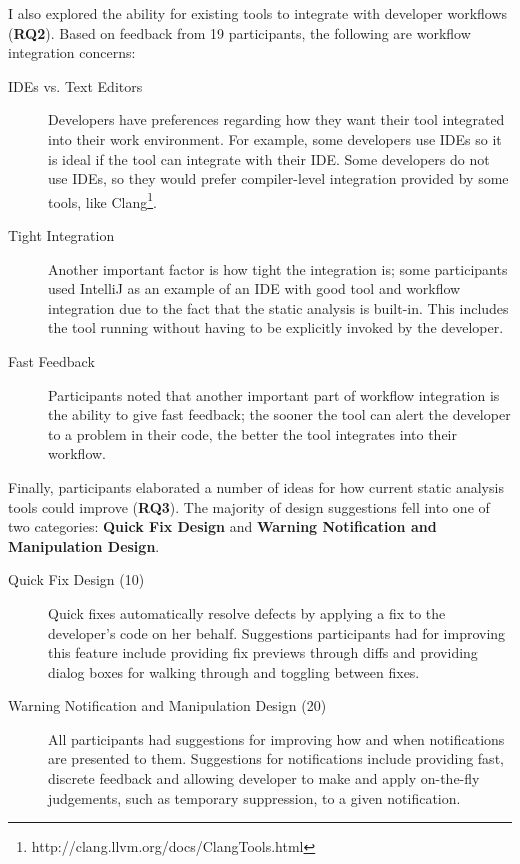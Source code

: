 \documentclass{llncs}
\begin{document}
I also explored the ability for existing tools to integrate with developer workflows (\textbf{RQ2}). Based on feedback from 19 participants, the following are workflow integration concerns:
\begin{description}
	\item[IDEs vs. Text Editors] Developers have preferences regarding how they want their tool integrated into their work environment. For example, some developers use IDEs so it is ideal if the tool can integrate with their IDE. Some developers do not use IDEs, so they would prefer compiler-level integration provided by some tools, like Clang\footnote{http://clang.llvm.org/docs/ClangTools.html}.
	\item[Tight Integration] Another important factor is how tight the integration is; some participants used IntelliJ as an example of an IDE with good tool and workflow integration due to the fact that the static analysis is built-in. This includes the tool running without having to be explicitly invoked by the developer.
	\item [Fast Feedback] Participants noted that another important part of workflow integration is the ability to give fast feedback; the sooner the tool can alert the developer to a problem in their code, the better the tool integrates into their workflow.
\end{description}

Finally, participants elaborated a number of ideas for how current static analysis tools could improve (\textbf{RQ3}). 
The majority of design suggestions fell into one of two categories: \textbf{Quick Fix Design} and \textbf{Warning Notification and Manipulation Design}.
\begin{description}
	\item[Quick Fix Design (10)] Quick fixes automatically resolve defects by applying a fix to the developer's code on her behalf. Suggestions participants had for improving this feature include providing fix previews through diffs and providing dialog boxes for walking through and toggling between fixes. 
	\item [Warning Notification and Manipulation Design (20)] All participants had suggestions for improving how and when notifications are presented to them. Suggestions for notifications include providing fast, discrete feedback and allowing developer to make and apply on-the-fly judgements, such as temporary suppression, to a given notification. 
\end{description}
\end{document}
